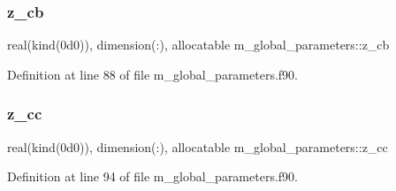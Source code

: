\mbox{\label{namespacem__global__parameters_a1f932e794cad6291b2e6c62b93dcf533}} 
\subsubsection{\texorpdfstring{z\+\_\+cb}{z\_cb}}
{\footnotesize\ttfamily real(kind(0d0)), dimension(\+:), allocatable m\+\_\+global\+\_\+parameters\+::z\+\_\+cb}



Definition at line 88 of file m\+\_\+global\+\_\+parameters.\+f90.

\mbox{\label{namespacem__global__parameters_a2c4b9e99b981dc55cccf0b153159404e}} 
\subsubsection{\texorpdfstring{z\+\_\+cc}{z\_cc}}
{\footnotesize\ttfamily real(kind(0d0)), dimension(\+:), allocatable m\+\_\+global\+\_\+parameters\+::z\+\_\+cc}



Definition at line 94 of file m\+\_\+global\+\_\+parameters.\+f90.

